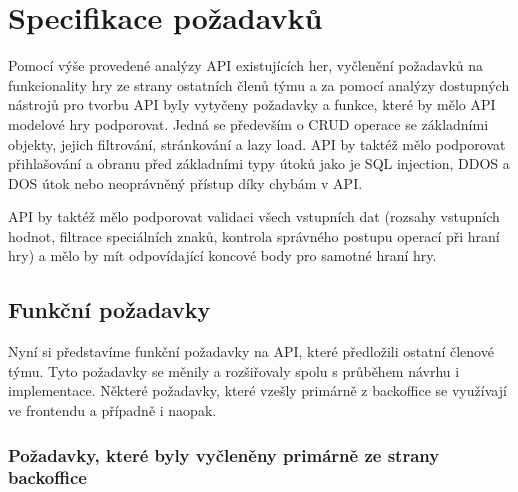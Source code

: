 \section{Specifikace požadavků}
Pomocí výše provedené analýzy API existujících her, vyčlenění požadavků na funkcionality hry ze strany ostatních členů týmu a za pomocí analýzy dostupných nástrojů pro tvorbu API byly vytyčeny požadavky a funkce, které by mělo API modelové hry podporovat. Jedná se především o CRUD operace se základními objekty, jejich filtrování, stránkování a lazy load. API by taktéž mělo podporovat přihlašování a obranu před základními typy útoků jako je SQL injection, DDOS a DOS útok nebo neoprávněný přístup díky chybám v API.

API by taktéž mělo podporovat validaci všech vstupních dat (rozsahy vstupních hodnot, filtrace speciálních znaků, kontrola správného postupu operací při hraní hry) a mělo by mít odpovídající koncové body pro samotné hraní hry.

\subsection{Funkční požadavky}
Nyní si představíme funkční požadavky na API, které předložili ostatní členové týmu. Tyto požadavky se měnily a rozšiřovaly spolu s průběhem návrhu i implementace. Některé požadavky, které vzešly primárně z backoffice se využívají ve frontendu a případně i naopak.

\subsubsection*{Požadavky, které byly vyčleněny primárně ze strany backoffice}

